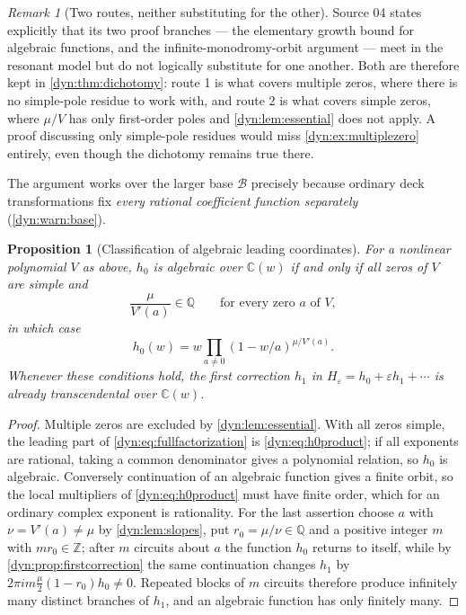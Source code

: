 \documentclass[11pt,letterpaper]{article}
\newtheorem{proposition}[proposition]{Proposition}
\theoremstyle{definition}
\theoremstyle{remark}
\newtheorem{remark}[remark]{Remark}
\newcommand{\C}{\mathbb C}
\newcommand{\Q}{\mathbb Q}
\newcommand{\Z}{\mathbb Z}
\newcommand{\BB}{\mathscr B}
\newcommand{\eps}{\varepsilon}
\numberwithin{equation}{section}
\begin{document}
\begin{remark}[Two routes, neither substituting for the other]
\label{dyn:rem:tworoutes-alg}
Source 04 states explicitly that its two proof branches --- the elementary
growth bound for algebraic functions, and the infinite-monodromy-orbit
argument --- meet in the resonant model but do not logically substitute for
one another. Both are therefore kept in \cref{dyn:thm:dichotomy}: route 1
is what covers multiple zeros, where there is no simple-pole residue to
work with, and route 2 is what covers simple zeros, where $\mu/V$ has only
first-order poles and \cref{dyn:lem:essential} does not apply. A proof
discussing only simple-pole residues would miss
\cref{dyn:ex:multiplezero} entirely, even though the dichotomy remains
true there.
\end{remark}

The argument works over the larger base $\BB$ precisely because ordinary
deck transformations fix \emph{every rational coefficient function
separately} (\cref{dyn:warn:base}).

\begin{proposition}[Classification of algebraic leading coordinates]
\label{dyn:prop:leadingalgebraic}
For a nonlinear polynomial $V$ as above, $h_0$ is algebraic over $\C(w)$
if and only if all zeros of $V$ are simple and
\begin{equation}\label{dyn:eq:rationalresidues}
 \frac{\mu}{V'(a)}\in\Q\qquad\text{for every zero }a\text{ of }V ,
\end{equation}
in which case
\begin{equation}\label{dyn:eq:h0product}
 h_0(w)=w\prod_{a\ne0}(1-w/a)^{\mu/V'(a)} .
\end{equation}
Whenever these conditions hold, the first correction $h_1$ in
$H_\eps=h_0+\eps h_1+\cdots$ is \emph{already} transcendental over
$\C(w)$.
\end{proposition}
\begin{proof}
Multiple zeros are excluded by \cref{dyn:lem:essential}. With all zeros
simple, the leading part of \eqref{dyn:eq:fullfactorization} is
\eqref{dyn:eq:h0product}; if all exponents are rational, taking a common
denominator gives a polynomial relation, so $h_0$ is algebraic. Conversely
continuation of an algebraic function gives a finite orbit, so the local
multipliers of \eqref{dyn:eq:h0product} must have finite order, which for
an ordinary complex exponent is rationality. For the last assertion choose
$a$ with $\nu=V'(a)\ne\mu$ by \cref{dyn:lem:slopes}, put
$r_0=\mu/\nu\in\Q$ and a positive integer $m$ with $mr_0\in\Z$; after $m$
circuits about $a$ the function $h_0$ returns to itself, while by
\cref{dyn:prop:firstcorrection} the same continuation changes $h_1$ by
$2\pi im\frac\mu2(1-r_0)h_0\ne0$. Repeated blocks of $m$ circuits therefore
produce infinitely many distinct branches of $h_1$, and an algebraic
function has only finitely many.
\end{proof}
\end{document}
